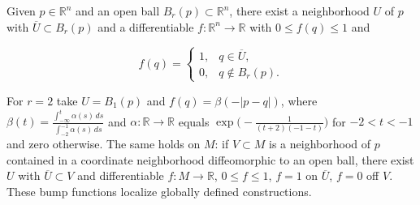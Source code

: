 \begin{remark}
  \label{rem:dc-ch0-5-7}
\leanok
  Given $p\in\mathbb{R}^n$ and an open ball $B_r(p)\subset\mathbb{R}^n$, there exist
  a neighborhood $U$ of $p$ with $\overline U\subset B_r(p)$ and a differentiable
  $f:\mathbb{R}^n\to\mathbb{R}$ with $0\le f(q)\le1$ and
  
  $$
  f(q)=\begin{cases}1,&q\in\overline U,\\ 0,&q\notin B_r(p).\end{cases}
  $$
  
  For $r=2$ take $U=B_1(p)$ and $f(q)=\beta(-|p-q|)$, where
  $\beta(t)=\frac{\int_{-\infty}^t\alpha(s)\,ds}{\int_{-2}^{-1}\alpha(s)\,ds}$ and
  $\alpha:\mathbb{R}\to\mathbb{R}$ equals $\exp\big(-\frac{1}{(t+2)(-1-t)}\big)$ for
  $-2<t<-1$ and zero otherwise. The same holds on $M$: if $V\subset M$ is a
  neighborhood of $p$ contained in a coordinate neighborhood diffeomorphic to an
  open ball, there exist $U$ with $\overline U\subset V$ and differentiable
  $f:M\to\mathbb{R}$, $0\le f\le1$, $f=1$ on $\overline U$, $f=0$ off $V$.
  These bump functions localize globally defined constructions.
\end{remark}
